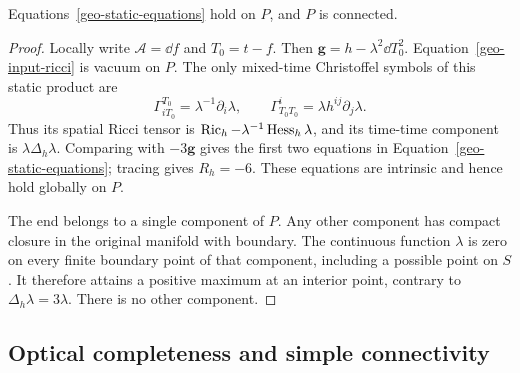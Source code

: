 \begin{lemma}
\label{geo-static-on-P}
Equations~\eqref{geo-static-equations} hold on $P$, and $P$ is connected.
\end{lemma}
\begin{proof}
Locally write $\mathcal A=\dd f$ and $T_0=t-f$.  Then
$\mathbf g=h-\lambda^2\dd T_0^2$.  Equation~\eqref{geo-input-ricci} is
vacuum on $P$.  The only mixed-time Christoffel symbols of this static
product are
\[
 \Gamma^{T_0}_{iT_0}=\lambda^{-1}\partial_i\lambda,
 \qquad \Gamma^i_{T_0T_0}=\lambda h^{ij}\partial_j\lambda.
\]
Thus its spatial Ricci tensor is
$\operatorname{Ric}_h-\lambda^{-1}\operatorname{Hess}_h\lambda$, and its time-time component is
$\lambda\Delta_h\lambda$.  Comparing with $-3\mathbf g$ gives the first
two equations in Equation~\eqref{geo-static-equations}; tracing gives
$R_h=-6$.  These equations are intrinsic and hence hold globally on $P$.

The end belongs to a single component of $P$.  Any other component has
compact closure in the original manifold with boundary.  The continuous
function $\lambda$ is zero on every finite boundary point of that component,
including a possible point on $S$.  It therefore attains a positive maximum
at an interior point, contrary to $\Delta_h\lambda=3\lambda$.  There is no
other component.
\end{proof}

\subsection{Optical completeness and simple connectivity}

